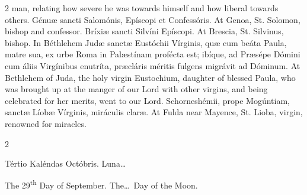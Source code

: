 \begin{paracol}{2}
 man, relating how severe he was towards himself and how liberal towards 
 others.
\switchcolumn*
{}
Génuæ sancti Salomónis, 
 Epíscopi et Confessóris.
\switchcolumn
{}
At Genoa, St. Solomon, bishop and 
 confessor.
\switchcolumn*
{}
Bríxiæ sancti Silvíni 
 Epíscopi.
\switchcolumn
{}
At Brescia, St. Silvinus, bishop.
\switchcolumn*
{}
In Béthlehem Judæ 
 sanctæ Eustóchii Vírginis, quæ cum beáta Paula, matre sua, ex urbe Roma in 
 Palæstínam profécta est; ibíque, ad Præsépe Dómini cum áliis Virgínibus 
 enutríta, præcláris méritis fulgens migrávit ad Dóminum.
\switchcolumn
{}
At Bethlehem of Juda, the holy 
 virgin Eustochium, daughter of blessed Paula, who was brought up at 
 the manger of our Lord with other virgins, and being celebrated for her 
 merits, went to our Lord.
\switchcolumn*
{}
Schorneshémii, prope 
 Mogúntiam, sanctæ Líobæ Vírginis, miráculis claræ.
\switchcolumn
{}
At Fulda near Mayence, St. Lioba, 
 virgin, renowned for miracles.
\switchcolumn*
{}
\end{paracol}


\begin{paracol}{2}
\begin{center}{\color{gregoriocolor} Tértio Kaléndas Octóbris. 
 Luna\dots\ }\end{center}
\switchcolumn
{}
\begin{center}{\color{gregoriocolor} The   29\textsuperscript{th} Day of 
 September. The\dots\ Day of the Moon.}\end{center}
\end{paracol}


